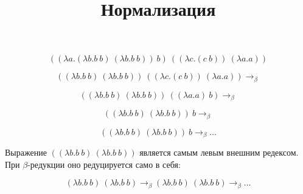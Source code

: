 \documentclass{article}
\title{Нормализация}
\begin{document}
\maketitle

\[
((\lambda a.(\lambda b.b\ b)\ (\lambda b.b\ b))\ b)\ ((\lambda c.(c\ b))\ (\lambda a.a))
\]

\[
((\lambda b.b\ b)\ (\lambda b.b\ b))\ ((\lambda c.(c\ b))\ (\lambda a.a)) \rightarrow_\beta
\]

\[
((\lambda b.b\ b)\ (\lambda b.b\ b))\ ((\lambda a.a)\ b) \rightarrow_\beta
\]

\[
((\lambda b.b\ b)\ (\lambda b.b\ b))\ b \rightarrow_\beta
\]

\[
((\lambda b.b\ b)\ (\lambda b.b\ b))\ b \rightarrow_\beta \dots
\]

Выражение $((\lambda b.b\ b)\ (\lambda b.b\ b))$ является самым левым внешним редексом. При $\beta$-редукции оно редуцируется само в себя:

\[
(\lambda b.b\ b)\ (\lambda b.b\ b) \rightarrow_\beta (\lambda b.b\ b)\ (\lambda b.b\ b) \rightarrow_\beta \dots
\]
\end{document}
